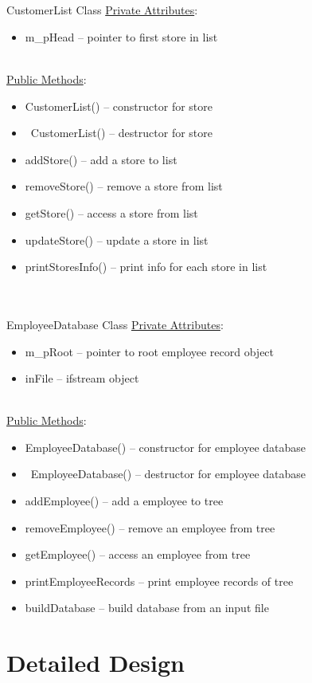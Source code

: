 \documentclass[12pt]{article}%
\begin{document}
\hfill\\
\hfill\\
CustomerList Class
\underline{Private Attributes}:
\begin{itemize}
    \item m\_pHead -- pointer to first store in list
    \end{itemize}
    \hfill\\
\underline{Public Methods}:
\begin{itemize}
    \item CustomerList() -- constructor for store
    \item ~CustomerList() -- destructor for store
    \item addStore() -- add a store to list
    \item removeStore() -- remove a store from list
    \item getStore() -- access a store from list
    \item updateStore() -- update a store in list
    \item printStoresInfo() -- print info for each store in list
    \end{itemize}
\hfill\\
\hfill\\
EmployeeDatabase Class
\underline{Private Attributes}:
\begin{itemize}
    \item m\_pRoot -- pointer to root employee record object
    \item inFile -- ifstream object
    \end{itemize}
    \hfill\\
\underline{Public Methods}:
\begin{itemize}
    \item EmployeeDatabase() -- constructor for employee database
    \item ~EmployeeDatabase() -- destructor for employee database
    \item addEmployee() -- add a employee to tree
    \item removeEmployee() -- remove an employee from tree
    \item getEmployee() -- access an employee from tree
    \item printEmployeeRecords -- print employee records of tree
    \item buildDatabase -- build database from an input file
\end{itemize}

\section{Detailed Design}
\end{document}
